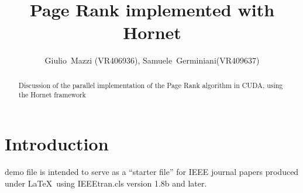 \documentclass[journal]{IEEEtran}
\begin{document}
\title{Page Rank implemented with Hornet}
\author{Giulio~Mazzi (VR406936), Samuele~Germiniani(VR409637)}

\markboth{}%
{}
\maketitle

\begin{abstract}
Discussion of the parallel implementation of the Page Rank algorithm 
in CUDA, using the Hornet framework
\end{abstract}

\section{Introduction}
 demo file is intended to serve as a ``starter file''
for IEEE journal papers produced under \LaTeX\ using
IEEEtran.cls version 1.8b and later.

\end{document}
